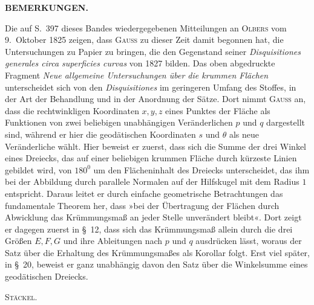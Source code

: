 %
\par{}\begin{center}\textbf{BEMERKUNGEN.}\end{center}
\noindent\hspace*{1.2em}Die auf S.\ 397 dieses Bandes wiedergegebenen Mitteilungen an \textsc{Olbers} vom 9.\ Oktober 1825 zeigen, dass \textsc{Gauss} zu dieser Zeit damit begonnen hat, die Untersuchungen zu Papier zu bringen, die den Gegenstand seiner \textit{Disquisitiones generales circa superficies curvas} von 1827 bilden. Das oben abgedruckte Fragment \textit{Neue allgemeine Untersuchungen über die krummen Flächen} unterscheidet sich von den \textit{Disquisitiones} im geringeren Umfang des Stoffes, in der Art der Behandlung und in der Anordnung der Sätze. Dort nimmt \textsc{Gauss} an, dass die rechtwinkligen Koordinaten $x,y,z$ eines Punktes der Fläche als Funktionen von zwei beliebigen unabhängigen Veränderlichen $p$ und $q$ dargestellt sind, während er hier die geodätischen Koordinaten $s$ und $\theta$ als neue Veränderliche wählt. Hier beweist er zuerst, dass sich die Summe der drei Winkel eines Dreiecks, das auf einer beliebigen krummen Fläche durch kürzeste Linien gebildet wird, von $180^{0}$ um den Flächeninhalt des Dreiecks unterscheidet, das ihm bei der Abbildung durch parallele Normalen auf der Hilfskugel mit dem Radius $1$ entspricht. Daraus leitet er durch einfache geometrische Betrachtungen das fundamentale Theorem her, dass »bei der Übertragung der Flächen durch Abwicklung das Krümmungsmaß an jeder Stelle unverändert bleibt«. Dort zeigt er dagegen zuerst in \S\ 12, dass sich das Krümmungsmaß allein durch die drei Größen $E,F,G$ und ihre Ableitungen nach $p$ und $q$ ausdrücken lässt, woraus der Satz über die Erhaltung des Krümmungsmaßes als Korollar folgt. Erst viel später, in \S\ 20, beweist er ganz unabhängig davon den Satz über die Winkelsumme eines geodätischen Dreiecks.
\begin{flushright}\textsc{Stäckel}.\end{flushright}
